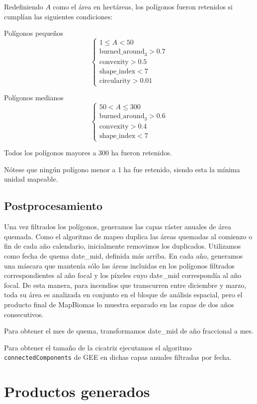\documentclass[11pt,a4paper]{article}
\begin{document}
Redefiniendo $A$ como el área en hectáreas, los polígonos fueron retenidos si cumplían las siguientes condiciones:

Polígonos pequeños
\[
\begin{cases}
1 \le A < 50 \\
\mathrm{burned\_around}_3 > 0.7 \\
\mathrm{convexity} > 0.5 \\
\mathrm{shape\_index} < 7 \\
\mathrm{circularity} > 0.01
\end{cases}
\]

Polígonos medianos
\[
\begin{cases}
50 < A \le 300 \\
\mathrm{burned\_around}_3 > 0.6 \\
\mathrm{convexity} > 0.4 \\
\mathrm{shape\_index} < 7
\end{cases}
\]

Todos los polígonos mayores a 300 ha fueron retenidos.

Nótese que ningún polígono menor a 1 ha fue retenido, siendo esta la mínima unidad mapeable.

\subsection{Postprocesamiento}

Una vez filtrados los polígonos, generamos las capas ráster anuales de área quemada. Como el algoritmo de mapeo duplica las áreas quemadas al comienzo o fin de cada año calendario, inicialmente removimos los duplicados. Utilizamos como fecha de quema date\_mid, definida más arriba. En cada año, generamos una máscara que mantenía sólo las áreas incluidas en los polígonos filtrados correspondientes al año focal y los píxeles cuyo date\_mid correspondía al año focal. De esta manera, para incendios que transcurren entre diciembre y marzo, toda su área es analizada en conjunto en el bloque de análisis espacial, pero el producto final de MapBiomas lo muestra separado en las capas de dos años consecutivos.

Para obtener el mes de quema, transformamos date\_mid de año fraccional a mes.

Para obtener el tamaño de la cicatriz ejecutamos el algoritmo \texttt{connectedComponents} de GEE en dichas capas anuales filtradas por fecha.

\section{Productos generados}
\end{document}
